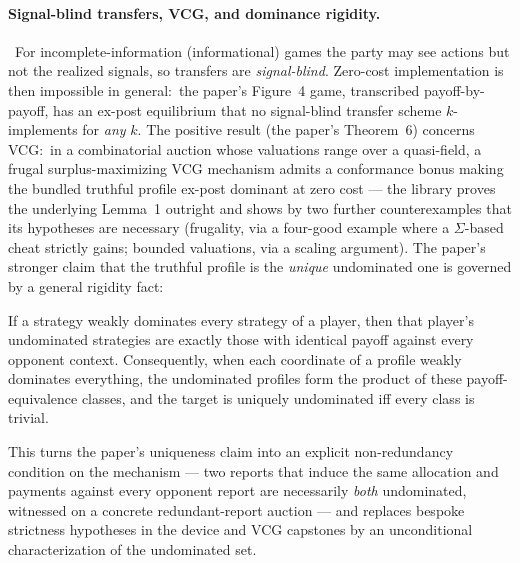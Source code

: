 \paragraph{Signal-blind transfers, VCG, and dominance rigidity.}\
For incomplete-information (informational) games the party may see
actions but not the realized signals, so transfers are
\emph{signal-blind}.  Zero-cost implementation is then impossible in
general:\ the paper's Figure~4 game, transcribed payoff-by-payoff, has
an ex-post equilibrium that no signal-blind transfer scheme
$k$-implements for \emph{any} $k$.  The positive result (the paper's
Theorem~6) concerns VCG:\ in a combinatorial auction whose valuations
range over a quasi-field, a frugal surplus-maximizing VCG mechanism
admits a conformance bonus making the bundled truthful profile
ex-post dominant at zero cost — the library proves the underlying
Lemma~1 outright and shows by two further counterexamples that its
hypotheses are necessary (frugality, via a four-good example where a
$\Sigma$-based cheat strictly gains; bounded valuations, via a
scaling argument).  The paper's stronger claim that the truthful
profile is the \emph{unique} undominated one is governed by a general
rigidity fact:

\begin{theorem}
\label{thm:kimpl-rigidity}
If a strategy weakly dominates every strategy of a player, then that
player's undominated strategies are exactly those with identical
payoff against every opponent context.  Consequently, when each
coordinate of a profile weakly dominates everything, the undominated
profiles form the product of these payoff-equivalence classes, and
the target is uniquely undominated iff every class is trivial.
\end{theorem}

\noindent This turns the paper's uniqueness claim into an explicit
non-redundancy condition on the mechanism — two reports that induce
the same allocation and payments against every opponent report are
necessarily \emph{both} undominated, witnessed on a concrete
redundant-report auction — and replaces bespoke strictness
hypotheses in the device and VCG capstones by an unconditional
characterization of the undominated set.


